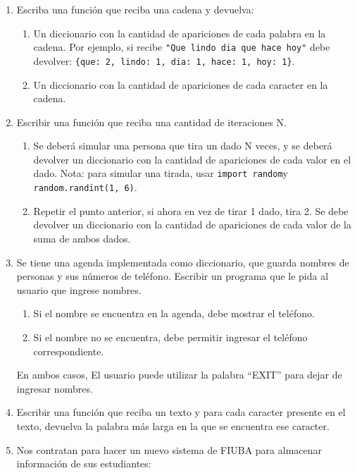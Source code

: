 \documentclass[
  letterpaper,
  DIV=11,
  numbers=noendperiod]{scrreprt}
\providecommand{\tightlist}{%
  \setlength{\itemsep}{0pt}\setlength{\parskip}{0pt}}\usepackage{longtable,booktabs,array}
\begin{document}
\begin{enumerate}
\def\labelenumi{\arabic{enumi}.}
\setcounter{enumi}{1}
\item
  Escriba una función que reciba una cadena y devuelva:

  \begin{enumerate}
  \def\labelenumii{\alph{enumii}.}
  \tightlist
  \item
    Un diccionario con la cantidad de apariciones de cada palabra en la
    cadena. Por ejemplo, si recibe
    \texttt{"Que\ lindo\ dia\ que\ hace\ hoy"} debe devolver:
    \texttt{\{\textquotesingle{}que\textquotesingle{}:\ 2,\ \textquotesingle{}lindo\textquotesingle{}:\ 1,\ \textquotesingle{}dia\textquotesingle{}:\ 1,\ \textquotesingle{}hace\textquotesingle{}:\ 1,\ \textquotesingle{}hoy\textquotesingle{}:\ 1\}}.
  \item
    Un diccionario con la cantidad de apariciones de cada caracter en la
    cadena.
  \end{enumerate}
\item
  Escribir una función que reciba una cantidad de iteraciones N.

  \begin{enumerate}
  \def\labelenumii{\alph{enumii}.}
  \item
    Se deberá simular una persona que tira un dado N veces, y se deberá
    devolver un diccionario con la cantidad de apariciones de cada valor
    en el dado. Nota: para simular una tirada, usar
    \texttt{import\ random}y \texttt{random.randint(1,\ 6)}.
  \item
    Repetir el punto anterior, si ahora en vez de tirar 1 dado, tira 2.
    Se debe devolver un diccionario con la cantidad de apariciones de
    cada valor de la suma de ambos dados.
  \end{enumerate}
\item
  Se tiene una agenda implementada como diccionario, que guarda nombres
  de personas y sus números de teléfono. Escribir un programa que le
  pida al usuario que ingrese nombres.

  \begin{enumerate}
  \def\labelenumii{\alph{enumii}.}
  \tightlist
  \item
    Si el nombre se encuentra en la agenda, debe mostrar el teléfono.
  \item
    Si el nombre no se encuentra, debe permitir ingresar el teléfono
    correspondiente.
  \end{enumerate}

  En ambos casos, El usuario puede utilizar la palabra ``EXIT'' para
  dejar de ingresar nombres.
\item
  Escribir una función que reciba un texto y para cada caracter presente
  en el texto, devuelva la palabra más larga en la que se encuentra ese
  caracter.
\item
  Nos contratan para hacer un nuevo sistema de FIUBA para almacenar
  información de sus estudiantes:


\end{enumerate}
\end{document}
